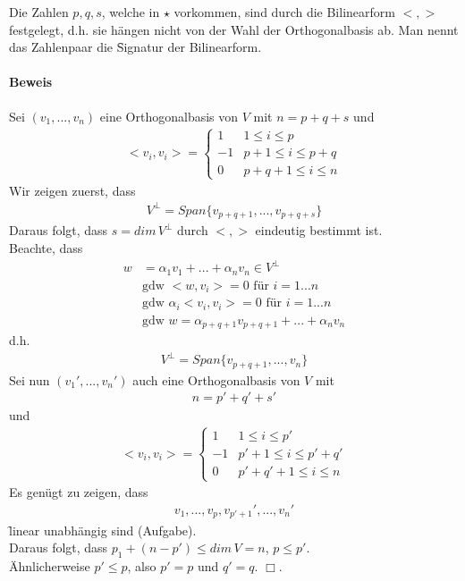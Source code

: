 \begin{satz} %
\label{satz525}
Die Zahlen $p, q, s$, welche in $\star$ vorkommen, sind durch die Bilinearform $<, >$ festgelegt, d.h. sie hängen nicht von der Wahl der Orthogonalbasis ab. Man nennt das Zahlenpaar die \f{Signatur} der Bilinearform.
\end{satz}

\paragraph{Beweis}
Sei $(v_1, ..., v_n)$ eine Orthogonalbasis von $V$ mit $n = p + q + s$ und 
\begin{align}
<v_i, v_i> = \left\{ \begin{matrix} 1 & 1 \leq i \leq p \\ -1 & p+1 \leq i \leq p+q \\ 0 & p+q+1 \leq i \leq n\end{matrix}\right.
\end{align}
Wir zeigen zuerst, dass
\begin{align}
V^{\perp} = Span\{v_{p+q+1}, ..., v_{p+q+s}\}
\end{align}
Daraus folgt, dass $s = dim\, V^{\perp}$ durch $<, >$ eindeutig bestimmt ist. \\
Beachte, dass
\begin{align}
w &= \alpha_1 v_1 + ... + \alpha_n v_n \in V^{\perp} \\
&\text{gdw } <w, v_i> = 0 \text{ für } i = 1...n \\
&\text{gdw } \alpha_i <v_i, v_i> = 0 \text{ für } i = 1...n \\
&\text{gdw } w = \alpha_{p+q+1} v_{p+q+1} + ... + \alpha_n v_n
\end{align}
d.h.
\begin{align}
V^{\perp} = Span\{v_{p+q+1}, ..., v_n\}
\end{align}
Sei nun $(v_1', ..., v_n')$ auch eine Orthogonalbasis von $V$ mit
\begin{align}
n = p' + q' + s' 
\end{align}
und
\begin{align}
<v_i, v_i> = \left\{ \begin{matrix} 1 & 1 \leq i \leq p' \\ -1 & p'+1 \leq i \leq p' + q' \\ 0 & p' + q' + 1 \leq i \leq n \end{matrix}\right.
\end{align}
Es genügt zu zeigen, dass
\begin{align}
v_1, ..., v_p, v_{p'+1}', ..., v_n'
\end{align}
\f{linear unabhängig} sind (Aufgabe). \\
Daraus folgt, dass $p_1 + (n-p') \leq dim\, V = n$, $p \leq p'$.\\
Ähnlicherweise $p'\leq p$, also $p' = p$ und $q' = q$. \hfill $\Box$.

